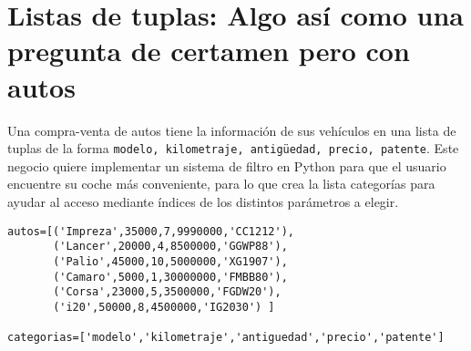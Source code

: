 \section{Listas de tuplas: Algo así como una pregunta de certamen pero con autos}

Una compra-venta de autos tiene la información de sus vehículos en una lista de tuplas de la forma \texttt{modelo, kilometraje, antigüedad, precio, patente}. Este negocio quiere implementar un sistema de filtro en Python para que el usuario encuentre su coche más conveniente, para lo que crea la lista categorías para ayudar al acceso mediante índices de los distintos parámetros a elegir.

\begin{lstlisting}[style=consola]
autos=[('Impreza',35000,7,9990000,'CC1212'),
       ('Lancer',20000,4,8500000,'GGWP88'),
       ('Palio',45000,10,5000000,'XG1907'),
       ('Camaro',5000,1,30000000,'FMBB80'),
       ('Corsa',23000,5,3500000,'FGDW20'),
       ('i20',50000,8,4500000,'IG2030') ]
        
categorias=['modelo','kilometraje','antiguedad','precio','patente']
\end{lstlisting}

